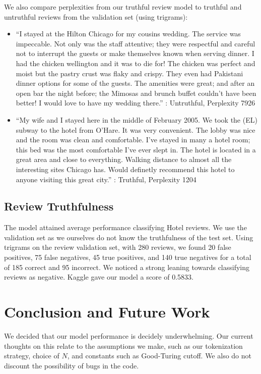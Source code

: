 \documentclass[12pt]{article}
\begin{document}
We also compare perplexities from our truthful review model to truthful and untruthful reviews from the validation set (using trigrams):
\begin{itemize}
\item ``I stayed at the Hilton Chicago for my cousins wedding. The service was impeccable. Not only was the staff attentive; they were respectful and careful not to interrupt the guests or make themselves known when serving dinner. I had the chicken wellington and it was to die for! The chicken was perfect and moist but the pastry crust was flaky and crispy. They even had Pakistani dinner options for some of the guests. The amenities were great; and after an open bar the night before; the Mimosas and brunch buffet couldn't have been better! I would love to have my wedding there.'' : Untruthful, Perplexity 7926

\item ``My wife and I stayed here in the middle of February 2005. We took the (EL) subway to the hotel from O'Hare. It was very convenient. The lobby was nice and the room was clean and comfortable. I've stayed in many a hotel room; this bed was the most comfortable I've ever slept in. The hotel is located in a great area and close to everything. Walking distance to almost all the interesting sites Chicago has. Would definetly recommend this hotel to anyone visiting this great city.'' : Truthful, Perplexity 1204
\end{itemize}

\subsection{Review Truthfulness}
The model attained average performance classifying Hotel reviews. We use the validation set as we ourselves do not know the truthfulness of the test set. Using trigrams on the review validation set, with 280 reviews, we found 20 false positives, 75 false negatives, 45 true positives, and 140 true negatives for a total of 185 correct and 95 incorrect. We noticed a strong leaning towards classifying reviews as negative. Kaggle gave our model a score of 0.5833.

\section{Conclusion and Future Work}
We decided that our model performance is decidely underwhelming. Our current thoughts on this relate to the assumptions we make, such as our tokenization strategy, choice of $N$, and constants such as Good-Turing cutoff. We also do not discount the possibility of bugs in the code. 
\end{document}
